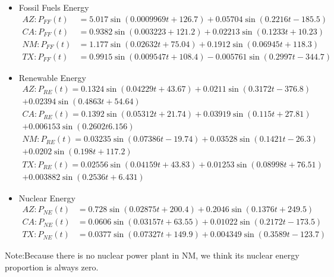 \begin{itemize}
	\item Fossil Fuels Energy\\
	\begin{align}
	AZ:P_{FF}(t)&=5.017\sin(0.0009969t+126.7)+0.05704\sin(0.2216t-185.5)\\%
	CA:P_{FF}(t)&=0.9382\sin(0.003223+121.2)+0.02213\sin(0.1233t+10.23)\\%
	NM:P_{FF}(t)&=1.177\sin(0.02632t+75.04)+0.1912\sin(0.06945t+118.3)\\%
	TX:P_{FF}(t)&=0.9915\sin(0.009547t+108.4)-0.005761\sin(0.2997t-344.7)%
	\end{align}
	\item Renewable Energy\\
	\begin{multline}
	AZ:P_{RE}(t)=0.1324\sin(0.04229t+43.67)+0.0211\sin(0.3172t-376.8)\\+0.02394\sin(0.4863t+54.64)%
	\end{multline}
	\begin{multline}
	CA:P_{RE}(t)=0.1392\sin(0.05312t+21.74)+0.03919\sin(0.115t+27.81)\\+0.006153\sin(0.2602t6.156)%
	\end{multline}
	\begin{multline}
	NM:P_{RE}(t)=0.03235\sin(0.07386t-19.74)+0.03528\sin(0.1421t-26.3)\\+0.0202\sin(0.198t+117.2)%
	\end{multline}
	\begin{multline}
	TX:P_{RE}(t)=0.02556\sin(0.04159t+43.83)+0.01253\sin(0.08998t+76.51)\\+0.003882\sin(0.2536t+6.431)%
	\end{multline}
	\item Nuclear Energy\\
	\begin{align}
	AZ:P_{NE}(t)&=0.728\sin(0.02875t+200.4)+0.2046\sin(0.1376t+249.5)\\%
	CA:P_{NE}(t)&=0.0606\sin(0.03157t+63.55)+0.01022\sin(0.2172t-173.5)\\%
	TX:P_{NE}(t)&=0.0377\sin(0.07327t+149.9)+0.004349\sin(0.3589t-123.7)%
	\end{align}
\end{itemize}
Note:Because there is no nuclear power plant in NM, we think its nuclear energy proportion is always zero.
